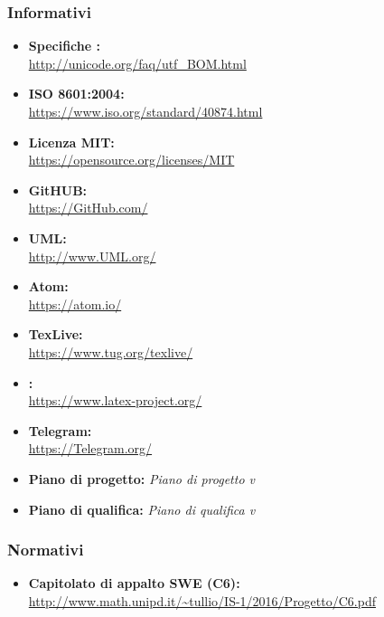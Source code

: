     \subsubsection{Informativi}
      \begin{itemize}
        \item \textbf{Specifiche :}\\
        \url{http://unicode.org/faq/utf_BOM.html}
        \item \textbf{ISO 8601:2004:} \\
        \url{https://www.iso.org/standard/40874.html}\\
        \item \textbf{Licenza MIT:}\\
        \url{https://opensource.org/licenses/MIT}
        \item \textbf{GitHUB:}\\
        \url{https://GitHub.com/}
        \item \textbf{UML:} \\
        \url{http://www.UML.org/}
        \item \textbf{Atom:}\\
        \url{https://atom.io/}
        \item \textbf{TexLive:}\\
        \url{https://www.tug.org/texlive/}
        \item \textbf{\glossaryItem{\LaTeX}:}\\
        \url{https://www.latex-project.org/}
        \item \textbf{Telegram:}\\
        \url{https://Telegram.org/}
        \item \textbf{Piano di progetto:} \emph{Piano di progetto v}\VersionePP{}
        \item \textbf{Piano di qualifica:} \emph{Piano di qualifica v}\VersionePQ{}
      \end{itemize}
    \subsubsection{Normativi}
      \begin{itemize}
        \item \textbf{Capitolato di appalto SWE (C6):}\\
        \url{http://www.math.unipd.it/~tullio/IS-1/2016/Progetto/C6.pdf}
      \end{itemize}
